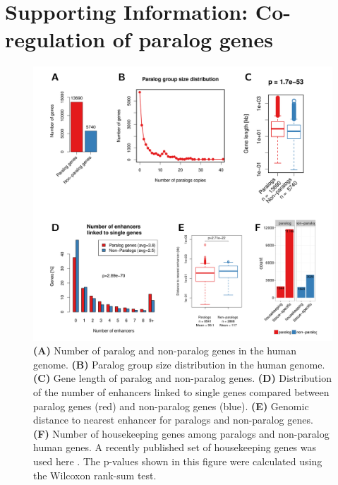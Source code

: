 \documentclass[a4paper,twoside=true,openright,parskip=full,chapterprefix=true,11pt,headings=normal,bibliography=totoc,listof=totoc,titlepage=on,captions=tableabove,draft=false]{scrreprt}
\theoremstyle{definition}
\theoremstyle{definition}
\theoremstyle{definition}
\theoremstyle{remark}
\begin{document}
\hypertarget{refs}{}

\hypertarget{appendix-appendix}{%
\appendix}


\hypertarget{sup-paralog-regulation}{%
\chapter{Supporting Information: Co-regulation of paralog
genes}\label{sup-paralog-regulation}}

\begin{figure}

{\centering \includegraphics[width=0.8\linewidth]{figures/paralog/SI/figS1} 

}

\caption{\textbf{(A)} Number of paralog and non-paralog genes
in the human genome. \textbf{(B)} Paralog group size distribution in the
human genome. \textbf{(C)} Gene length of paralog and non-paralog genes.
\textbf{(D)} Distribution of the number of enhancers linked to single
genes compared between paralog genes (red) and non-paralog genes (blue).
\textbf{(E)} Genomic distance to nearest enhancer for paralogs and
non-paralog genes. \textbf{(F)} Number of housekeeping genes among
paralogs and non-paralog human genes. A recently published set of
housekeeping genes was used here \citep{Eisenberg2013}. The p-values
shown in this figure were calculated using the Wilcoxon rank-sum test.}\label{fig:paraVSnonPara}
\end{figure}
\end{document}
